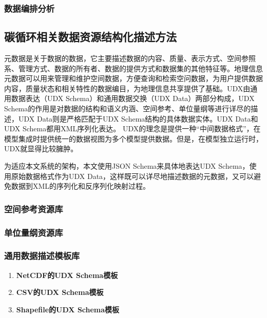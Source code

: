 \subsubsection{数据编排分析}

\subsection{碳循环相关数据资源结构化描述方法}
元数据是关于数据的数据，它主要描述数据的内容、质量、表示方式、空间参照系、管理方式、数据的所有者、数据的提供方式和数据集的其他特征等。地理信息元数据可以用来管理和维护空间数据，方便查询和检索空问数据，为用户提供数据内容，质量状态和相关特性的数据编目，为地理信息共享提供了基础。UDX由通用数据表达（UDX Schema）和通用数据交换（UDX Data）两部分构成，UDX Schema的作用是对数据的结构和语义内涵、空间参考、单位量纲等进行详尽的描述，UDX Data则是严格匹配于UDX Schema结构的具体数据实体。UDX Data和UDX Schema都用XML序列化表达。
UDX的理念是提供一种“中间数据格式”，在模型集成时提供统一的数据视图为多个模型提供数据。但是，在模型独立运行时，UDX就显得比较臃肿。



为适应本文系统的架构，本文使用JSON Schema来具体地表达UDX Schema，使用原始数据格式作为UDX Data，这样既可以详尽地描述数据的元数据，又可以避免数据到XML的序列化和反序列化映射过程。

\subsubsection{空间参考资源库}

\subsubsection{单位量纲资源库}

\subsubsection{通用数据描述模板库}

\begin{enumerate}[(1)]
\item \textbf{NetCDF的UDX Schema模板}
\item \textbf{CSV的UDX Schema模板}
\item \textbf{Shapefile的UDX Schema模板}
\end{enumerate}

